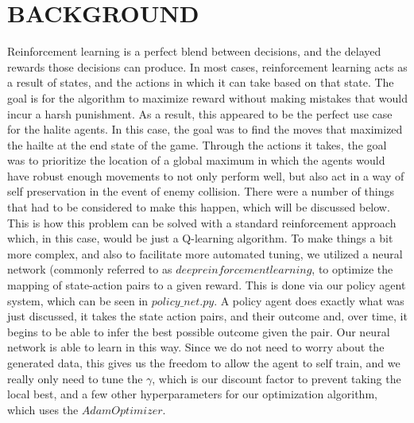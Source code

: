 \documentclass[letterpaper, 11 pt, conference]{ieeeconf}  %
\begin{document}
\section{BACKGROUND}
Reinforcement learning is a perfect blend between decisions, and the delayed rewards those decisions can produce. In most cases, reinforcement learning acts as a result of states, and the actions in which it can take based on that state. The goal is for the algorithm to maximize reward without making mistakes that would incur a harsh punishment. As a result, this appeared to be the perfect use case for the halite agents. In this case, the goal was to find the moves that maximized the hailte at the end state of the game. Through the actions it takes, the goal was to prioritize the location of a global maximum in which the agents would have robust enough movements to not only perform  well, but also act in a way of self preservation in the event of enemy collision. There were a number of things that had to be considered to make this happen, which will be discussed below. This is how this problem can be solved with a standard reinforcement approach which, in this case, would be just a Q-learning algorithm. To make things a bit more complex, and also to facilitate more automated tuning, we utilized a neural network (commonly referred to as $deep reinforcement learning$, to optimize the mapping of state-action pairs to a given reward. This is done via our policy agent system, which can be seen in $policy\_net.py$. A policy agent does exactly what was just discussed, it takes the state action pairs, and their outcome and, over time, it begins to be able to infer the best possible outcome given the pair. Our neural network is able to learn in this way. Since we do not need to worry about the generated data, this gives us the freedom to allow the agent to self train, and we really only need to tune the $\gamma$, which is our discount factor to prevent taking the local best, and a few other hyperparameters for our optimization algorithm, which uses the $Adam Optimizer$.
\end{document}
